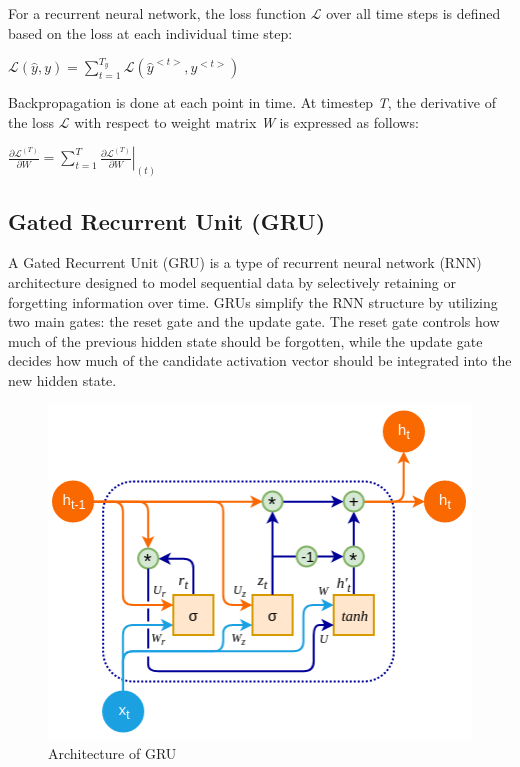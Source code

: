 \documentclass{ieeeojies}
\begin{document}
For a recurrent neural network, the loss function $\mathcal{L}$ over all time steps is defined based on the loss at each individual time step:
\newline \centerline{$\mathcal{L}(\hat{y},y) = \displaystyle \sum_{t=1}^{T_{y}}\mathcal{L}(\hat{y}^{<t>},y^{<t>})$}
Backpropagation is done at each point in time. At timestep \textit{T}, the derivative of the loss $\mathcal{L}$ with respect to weight matrix \textit{W} is expressed as follows:
\newline \centerline{$\displaystyle \frac{\partial \mathcal{L}^{(T)}}{\partial W} = \displaystyle \sum_{t=1}^{T} \left. \frac{\partial \mathcal{L}^{(T)}}{\partial W} \right|_{(t)}$}
\subsection{Gated Recurrent Unit (GRU)}
A Gated Recurrent Unit (GRU) is a type of recurrent neural network (RNN) architecture designed to model sequential data by selectively retaining or forgetting information over time. GRUs simplify the RNN structure by utilizing two main gates: the reset gate and the update gate. The reset gate controls how much of the previous hidden state should be forgotten, while the update gate decides how much of the candidate activation vector should be integrated into the new hidden state.
\begin{figure}[H]
	\centering
	\begin{minipage}{0.25\textwidth}
		\centering
		\includegraphics[width=1\textwidth]{bibliography/Images/GRU_Img1.png}
		\caption{Architecture of GRU}
		\label{fig:1}
	\end{minipage}
\end{figure}
\end{document}

